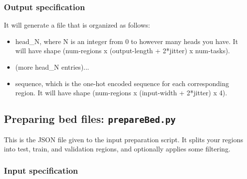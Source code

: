 \documentclass{article}
\begin{document}
\subsubsection{Output specification}

It will generate a file that is organized as follows:

\begin{itemize}
    \item head\_N, where N is an integer from 0 to however many heads you have. It will have shape (num-regions x (output-length + 2*jitter) x num-tasks). 
    \item (more head\_N entries)...
    \item sequence, which is the one-hot encoded sequence for each corresponding region. It will have shape (num-regions x (input-width + 2*jitter) x 4). 
\end{itemize}




\newpage

\subsection{Preparing bed files: \texttt{prepareBed.py}}

This is the JSON file given to the input preparation script. It splits your regions into 
test, train, and validation regions, and optionally applies some filtering. 

\subsubsection{Input specification}
\end{document}
